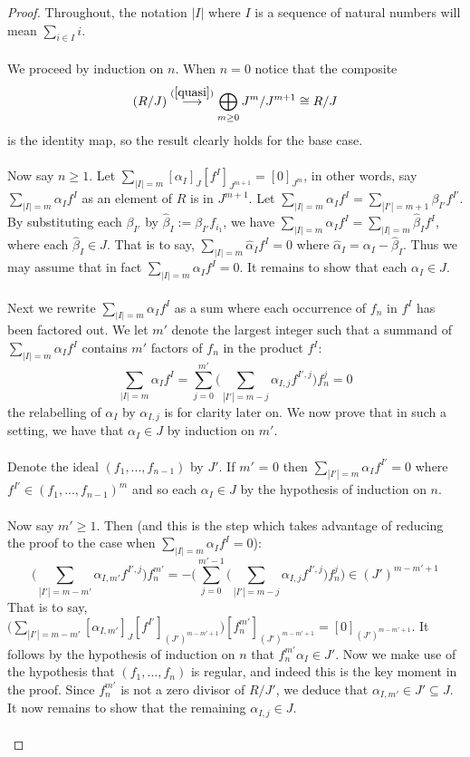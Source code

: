 \documentclass[12pt]{article}
\theoremstyle{plain}
\theoremstyle{definition}
\begin{document}
\begin{proof}
Throughout, the notation $|I|$ where $I$ is a sequence of natural numbers will mean $\sum_{i \in I}i$.\\\\
%
We proceed by induction on $n$. When $n = 0$ notice that the composite
\[(R/J) \stackrel{(\ref{quasi})}{\longrightarrow}\bigoplus_{m \geq 0}J^m/J^{m+1} \cong R/J\]
is the identity map, so the result clearly holds for the base case.\\\\
%
Now say $n \geq 1$. Let $\sum_{|I| = m}[\alpha_I]_{J} [f^I]_{J^{m+1}} = [0]_{J^m}$, in other words, say $\sum_{|I| = m}\alpha_I f^I$ as an element of $R$ is in $J^{m+1}$. Let $\sum_{|I| = m}\alpha_I f^I = \sum_{|I'| = m + 1}\beta_{I'}f^{I'}$. By substituting each $\beta_{I'}$ by $\hat{\beta}_I := \beta_{I'}f_{i_1}$, we have $\sum_{|I| = m}\alpha_I f^I = \sum_{|I| = m}\hat{\beta}_If^I$, where each $\hat{\beta}_I \in J$. That is to say, $\sum_{|I| = m}\hat{\alpha}_If^I = 0$ where $\hat{\alpha}_I = \alpha_I - \hat{\beta}_I$. Thus we may assume that in fact $\sum_{|I| = m} \alpha_If^I = 0$. It remains to show that each $\alpha_I \in J$.\\\\
%
Next we rewrite $\sum_{|I| = m} \alpha_If^I$ as a sum where each occurrence of $f_n$ in $f^I$ has been factored out. We let $m'$ denote the largest integer such that a summand of $\sum_{|I| = m} \alpha_If^I$ contains $m'$ factors of $f_n$ in the product $f^I$:
\[\sum_{|I| = m} \alpha_If^I = \sum_{j = 0}^{m'}\Big(\sum_{|I'| = m - j} \alpha_{I,j}f^{I',j}\Big)f_n^j = 0\]
the relabelling of $\alpha_I$ by $\alpha_{I,j}$ is for clarity later on. We now prove that in such a setting, we have that $\alpha_I \in J$ by induction on $m'$.\\\\
%
Denote the ideal $(f_1,...,f_{n-1})$ by $J'$. If $m'$ = 0 then $\sum_{|I'| = m} \alpha_If^{I'} = 0$ where $f^{I'} \in (f_1,...,f_{n-1})^m$ and so each $\alpha_I \in J$ by the hypothesis of induction on $n$.\\\\
%
Now say $m' \geq 1$. Then (and this is the step which takes advantage of reducing the proof to the case when $\sum_{|I| = m} \alpha_If^I = 0$):
\[\big(\sum_{|I'| = m - m'} \alpha_{I,m'}f^{I',j}\Big)f_n^{m'} = -\Big(\sum_{j = 0}^{m' - 1}\big(\sum_{|I'| = m - j} \alpha_{I,j}f^{I',j}\big)f_n^j\Big) \in (J')^{m-m'+1}\]
That is to say, $\Big(\sum_{|I'| = m - m'}[\alpha_{I,m'}]_{J}[f^{I'}]_{(J')^{m-m'+1}}\Big)[f_n^{m'}]_{(J')^{m-m'+1}} = [0]_{(J')^{m - m' + 1}}$. It follows by the hypothesis of induction on $n$ that $f_n^{m'}\alpha_I \in J'$. Now we make use of the hypothesis that $(f_1,...,f_n)$ is regular, and indeed this is the key moment in the proof. Since $f_n^{m'}$ is not a zero divisor of $R/J'$, we deduce that $\alpha_{I,m'} \in J' \subseteq J$. It now remains to show that the remaining $\alpha_{I,j} \in J$.\\\\

\end{proof}
\end{document}
